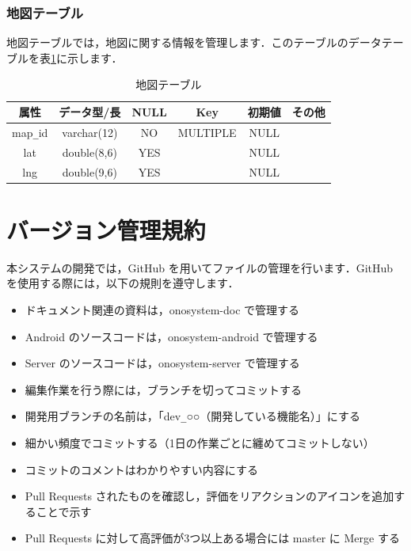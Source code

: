 \documentclass[a4j,titlepage]{jarticle}
\begin{document}
\subsubsection{地図テーブル}
地図テーブルでは，地図に関する情報を管理します．このテーブルのデータテーブルを表\ref{map}に示します．
\begin{table}[htb]
  \caption{地図テーブル}
  \label{map}
  \begin{center}
    \begin{tabular}{|c|c|c|c|c|c|} \hline
      属性 & データ型/長 & NULL & Key & 初期値 & その他 \\ \hline \hline
      map\verb|_|id & varchar(12) & NO & MULTIPLE & NULL & \\ \hline
      lat & double(8,6) & YES &   & NULL & \\ \hline
      lng & double(9,6) & YES &   & NULL & \\ \hline
    \end{tabular}
  \end{center}
\end{table}


\section{バージョン管理規約}
本システムの開発では，GitHub を用いてファイルの管理を行います．GitHub を使用する際には，以下の規則を遵守します．
\begin{itemize}
\item ドキュメント関連の資料は，onosystem-doc で管理する
\item Android のソースコードは，onosystem-android で管理する
\item Server のソースコードは，onosystem-server で管理する
\item 編集作業を行う際には，ブランチを切ってコミットする
\item 開発用ブランチの名前は，「dev\verb|_|○○（開発している機能名）」にする
\item 細かい頻度でコミットする（1日の作業ごとに纏めてコミットしない）
\item コミットのコメントはわかりやすい内容にする
\item Pull Requests されたものを確認し，評価をリアクションのアイコンを追加することで示す
\item Pull Requests に対して高評価が3つ以上ある場合には master に Merge する
\end{itemize}
\end{document}
